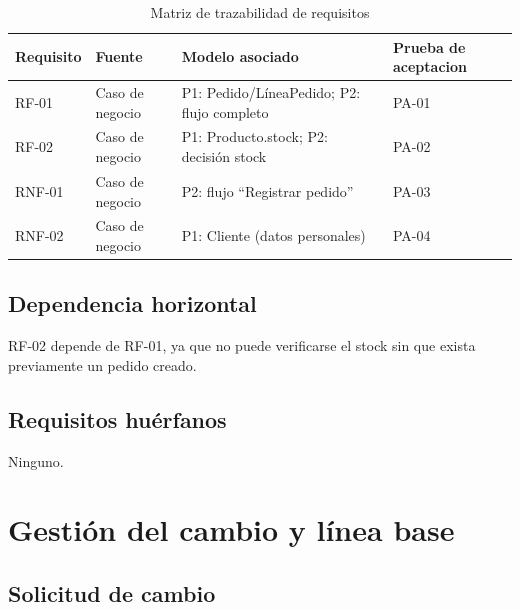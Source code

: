 \documentclass[11pt,a4paper]{article}
\begin{document}
\begin{table}[h!]
\centering
\small

\begin{tabular}{lp{2.3cm}p{5.2cm}l}

\toprule

\textbf{Requisito}
&
\textbf{Fuente}
&
\textbf{Modelo asociado}
&
\textbf{Prueba de aceptacion}
\\

\midrule

RF-01
&
Caso de negocio
&
P1: Pedido/LíneaPedido; P2: flujo completo
&
PA-01
\\

RF-02
&
Caso de negocio
&
P1: Producto.stock; P2: decisión stock
&
PA-02
\\

RNF-01
&
Caso de negocio
&
P2: flujo ``Registrar pedido''
&
PA-03
\\

RNF-02
&
Caso de negocio
&
P1: Cliente (datos personales)
&
PA-04
\\

\bottomrule

\end{tabular}

\caption{Matriz de trazabilidad de requisitos}

\end{table}


\subsection*{Dependencia horizontal}

RF-02 depende de RF-01, ya que no puede verificarse el stock sin que exista previamente un
pedido creado.

\subsection*{Requisitos huérfanos}

Ninguno.



\section{Gestión del cambio y línea base}

\subsection*{Solicitud de cambio}
\end{document}
